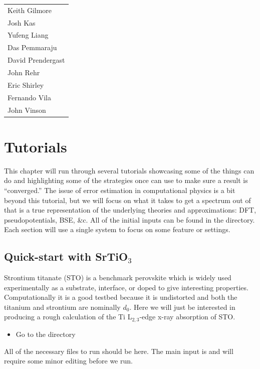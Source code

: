 \documentclass[11pt]{report}
\begin{document}
\begin{tabular}{l}
Keith Gilmore \\
Josh Kas \\
Yufeng Liang \\
Das Pemmaraju \\
David Prendergast \\
John Rehr \\
Eric Shirley \\
Fernando Vila \\
John Vinson \\
\end{tabular}

\chapter{Tutorials}

This chapter will run through several tutorials showcasing some of the things  can do and highlighting some of the strategies once can use to make sure a result is ``converged.'' The issue of error estimation in computational physics is a bit beyond this tutorial, but we will focus on what it takes to get a spectrum out of  that is a true representation of the underlying theories and approximations: DFT, pseudopotentials, BSE, \&c. All of the initial inputs can be found in the  directory. Each section will use a single system to focus on some feature or settings. 


\section{Quick-start with SrTiO$_3$}

Strontium titanate (STO) is a benchmark perovskite which is widely used experimentally as a substrate, interface, or doped to give interesting properties. 
Computationally it is a good testbed because it is undistorted and both the titanium and strontium are nominally $d_0$. Here we will just be interested in producing a rough calculation of the Ti L$_{2,3}$-edge x-ray absorption of STO.
\begin{itemize}
\item Go to the  directory
\end{itemize}
All of the necessary files to run should be here. The main input is  and will require some minor editing before we run. 
\end{document}
